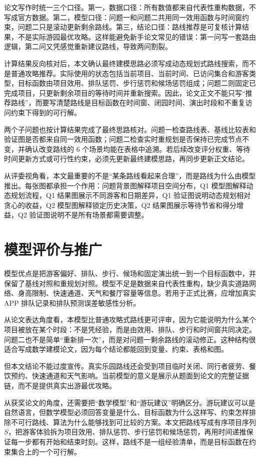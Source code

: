 \documentclass[UTF8,12pt,a4paper]{ctexart}
\begin{document}
论文写作时统一三个口径。第一，数据口径：所有数值都来自代表性重构数据，不写成官方数据。第二，模型口径：问题一和问题二共用同一效用函数与时间窗约束，问题二只是滚动更新剩余路线。第三，结论口径：路线推荐是可复核计算结果，不是实际游园最优攻略。这样能避免新手论文常见的错误：第一问写一套路由逻辑，第二问又凭感觉重新建议路线，导致两问割裂。

计算结果反向核对后，本文确认最终建模思路必须写成动态规划式路线搜索，而不是普通攻略推荐。实际使用的状态包括当前项目、当前时间、已访问集合和游客类型，目标函数由项目效用、排队惩罚、步行惩罚和候场惩罚组成；问题二则固定已完成项目，只更新剩余项目的等待时间并重新搜索。因此，论文正文不能只写“推荐路线”，而要写清楚路线是目标函数在时间窗、闭园时间、演出时段和不重复访问约束下得到的可行解。

两个子问题也按计算结果完成了最终思路核对。问题一检查路线表、基线比较表和验证图是否都来自同一效用函数；问题二检查实时重规划是否保持已完成节点不变，并确认改变路线的 6 个场景均能在表格中追溯。若后续改变评分权重、等待时间更新方式或可行性约束，必须先更新最终建模思路，再同步更新正文结论。

从评委视角看，本文最重要的不是“某条路线看起来合理”，而是路线为什么由模型推出。每张图都承担一个作用：问题背景图解释项目空间分布，Q1 模型图解释动态规划流程，Q1 结果图展示不同游客和日期差异，Q1 验证图说明动态规划相对贪心的收益，Q2 模型图解释锁定历史决策，Q2 结果图展示等待节省和得分增益，Q2 验证图说明不是所有场景都需要调整。

\section{模型评价与推广}

模型优点是把游客偏好、排队、步行、候场和固定演出统一到一个目标函数中，并保留了基线对照和重规划对照。模型不足是数据来自代表性重构，缺少真实道路网络、身高限制、快速通道、天气和餐厅容量等信息。若用于正式比赛，应增加真实 APP 排队记录和排队预测误差敏感性分析。

从论文表达角度看，本模型比普通攻略式路线更可评审，因为它能说明为什么某个项目被放在某个时段：不是凭经验，而是由效用、排队、步行和时间窗共同决定。问题二也不是简单“重新排一次”，而是对问题一剩余路线的滚动修正。这种结构很适合写成数学建模论文，因为每个结论都能回到变量、约束、表格和图。

但本文结论不能过度宣传。真实乐园路线还会受到项目临时关闭、同行者疲劳、餐饮预约、快速通道和天气影响。当前模型的意义是展示从题面到论文的完整证据链，而不是提供真实出游最优攻略。

从获奖论文的角度，还需要把“数学模型”和“游玩建议”明确区分。游玩建议可以是自然语言，但数学模型必须回答变量是什么、目标函数为什么这样写、约束怎样排除不可行路线、算法为什么能够找到可比较的方案。本文把路线写成有序项目序列 \(S\)，把游客体验拆为项目效用、排队惩罚、步行惩罚和候场惩罚，再用时间递推保证每一步都有开始和结束时刻。这样，路线不是一组经验清单，而是目标函数在约束集合上的一个可行解。
\end{document}
